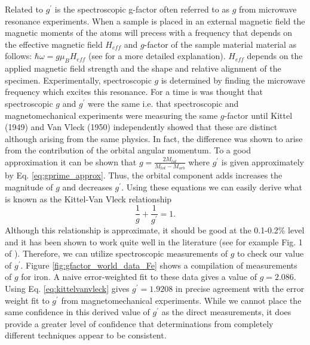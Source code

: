 \documentclass[12pt]{article}
\begin{document}
Related to $g^{\prime}$ is the spectroscopic g-factor often referred to as $g$ from microwave resonance experiments. When a sample is placed in an external magnetic field the magnetic moments of the atoms will precess with a frequency that depends on the effective magnetic field $H_{eff}$ and $g$-factor of the sample material material as follows: $\hbar\omega=g\mu_BH_{eff}$ (see \cite{Kittel1949, Smit1959} for a more detailed explanation). $H_{eff}$ depends on the applied magnetic field strength and the shape and relative alignment of the specimen. Experimentally, spectroscopic $g$ is determined by finding the microwave frequency which excites this resonance. For a time is was thought that spectroscopic $g$ and $g^{\prime}$ were the same i.e. that spectroscopic and magnetomechanical experiments were measuring the same $g$-factor until Kittel (1949)\cite{Kittel1949} and Van Vleck (1950)\cite{Vleck1950} independently showed that these are distinct although arising from the same physics. In fact, the difference was shown to arise from the contribution of the orbital angular momentum. To a good approximation it can be shown that $g=\frac{2M_{tot}}{M_{tot}-{M_{orb}}}$ where $g^{\prime}$ is given approximately by Eq. \ref{eq:gprime_approx}. Thus, the orbital component adds increases the magnitude of $g$ and decreases $g^{\prime}$. Using these equations we can easily derive what is known as the Kittel-Van Vleck relationship 
\begin{equation}
\frac{1}{g}+\frac{1}{g^{\prime}}=1.
\label{eq:kittelvanvleck}
\end{equation}
Although this relationship is approximate, it should be good at the 0.1-0.2\% level and it has been shown to work quite well in the literature (see for example Fig. 1 of \cite{Meyer1961}). Therefore, we can utilize spectroscopic measurements of $g$ to check our value of $g^{\prime}$. Figure \ref{fig:gfactor_world_data_Fe} shows a compilation of measurements of $g$ for iron. A naive error-weighted fit to these data gives a value of $g=2.086$. Using Eq. \ref{eq:kittelvanvleck} gives $g^{\prime}=1.9208$ in precise agreement with the error weight fit to $g^{\prime}$ from magnetomechanical experiments. While we cannot place the same confidence in this derived value of  $g^{\prime}$ as the direct measurements, it does provide a greater level of confidence that determinations from completely different techniques appear to be consistent.
\end{document}

